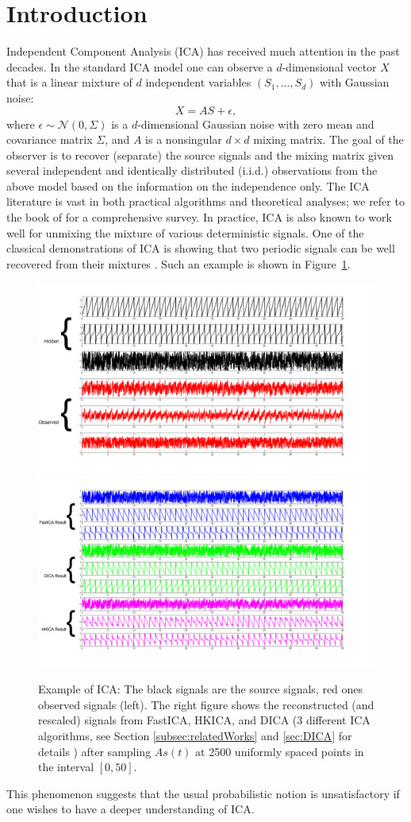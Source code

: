 \documentclass{article} %
\newcommand{\iid}{i.i.d.\xspace}
\theoremstyle{definition}
\begin{document}
\section{Introduction}
Independent Component Analysis (ICA)
has received much attention in the past decades. 
In the standard ICA model one can observe a $d$-dimensional vector $X$ that is a linear mixture of $d$ independent variables $(S_1,\ldots, S_d)$ with Gaussian noise:
\begin{equation}
\label{eq:stoch-ICA}
X = AS+\epsilon,
\end{equation}
where $\epsilon \sim \mathcal{N}(0,\Sigma)$ is a $d$-dimensional Gaussian noise with zero mean and covariance matrix $\Sigma$, and $A$ is a nonsingular $d \times d$ mixing matrix. 
The goal of the observer is to recover (separate) the source signals and the mixing matrix given several independent and identically distributed (\iid) observations from the above model based on the information on the independence only.
The ICA literature is vast in both practical algorithms and theoretical analyses; 
we refer to the book of \citet{comon2010handbook} for a comprehensive survey.
In practice, ICA is also known to work well for unmixing the mixture of various deterministic signals. 
One of the classical demonstrations of ICA is showing that two periodic signals can be well recovered from their mixtures \citep{HyvOja00}.
Such an example is shown in Figure~\ref{fig:demo}. 
\begin{figure}[h]
\label{fig:demo}
\centering
	\includegraphics[width = 0.49\linewidth]{demo_source}
	\includegraphics[width = 0.49\linewidth]{demo_res}
\caption{Example of ICA: The black signals are the source signals, red ones observed signals (left). The right figure shows the reconstructed (and rescaled) signals from FastICA, HKICA, and DICA (3 different ICA algorithms, see Section \ref{subsec:relatedWorks} and \ref{sec:DICA} for details ) after sampling $As(t)$ at 2500 uniformly spaced points in the interval $[0,50]$.}
\end{figure}
This phenomenon suggests that the usual probabilistic notion is unsatisfactory if one wishes to have a deeper understanding of ICA.  
\end{document}
